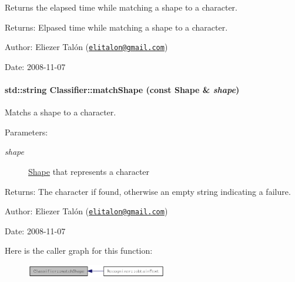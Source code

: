 Returns the elapsed time while matching a shape to a character. 

\begin{Desc}
\item[Returns:]Elpased time while matching a shape to a character.\end{Desc}
\begin{Desc}
\item[Author:]Eliezer Talón (\href{mailto:elitalon@gmail.com}{\tt elitalon@gmail.com}) \end{Desc}
\begin{Desc}
\item[Date:]2008-11-07 \end{Desc}
\hypertarget{class_classifier_6fd6a8332d3188ac605ff452ab6dc9c2}{
\paragraph[{matchShape}]{\setlength{\rightskip}{0pt plus 5cm}std::string Classifier::matchShape (const {\bf Shape} \& {\em shape})}\hfill}
\label{class_classifier_6fd6a8332d3188ac605ff452ab6dc9c2}


Matchs a shape to a character. 

\begin{Desc}
\item[Parameters:]
\begin{description}
\item[{\em shape}]\hyperlink{class_shape}{Shape} that represents a character\end{description}
\end{Desc}
\begin{Desc}
\item[Returns:]The character if found, otherwise an empty string indicating a failure.\end{Desc}
\begin{Desc}
\item[Author:]Eliezer Talón (\href{mailto:elitalon@gmail.com}{\tt elitalon@gmail.com}) \end{Desc}
\begin{Desc}
\item[Date:]2008-11-07 \end{Desc}


Here is the caller graph for this function:\nopagebreak
\begin{figure}[H]
\begin{center}
\leavevmode
\includegraphics[width=174pt]{class_classifier_6fd6a8332d3188ac605ff452ab6dc9c2_icgraph}
\end{center}
\end{figure}
